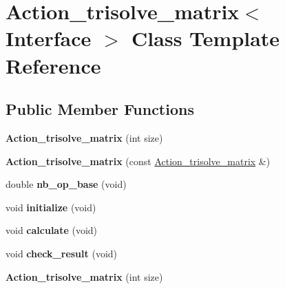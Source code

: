 \hypertarget{class_action__trisolve__matrix}{}\section{Action\+\_\+trisolve\+\_\+matrix$<$ Interface $>$ Class Template Reference}
\label{class_action__trisolve__matrix}
\subsection*{Public Member Functions}
\begin{DoxyCompactItemize}
\item 
\mbox{\label{class_action__trisolve__matrix_a69b680dabcaa6d127739ebf3249b5913}} 
{\bfseries Action\+\_\+trisolve\+\_\+matrix} (int size)
\item 
\mbox{\label{class_action__trisolve__matrix_a4a388b0c2524ea7dc74e7903eb2c8071}} 
{\bfseries Action\+\_\+trisolve\+\_\+matrix} (const \hyperlink{class_action__trisolve__matrix}{Action\+\_\+trisolve\+\_\+matrix} \&)
\item 
\mbox{\label{class_action__trisolve__matrix_aef787d79a7c993c4043afb05f583025d}} 
double {\bfseries nb\+\_\+op\+\_\+base} (void)
\item 
\mbox{\label{class_action__trisolve__matrix_a2770b4c49eeea866ea5a12e6aa2becd1}} 
void {\bfseries initialize} (void)
\item 
\mbox{\label{class_action__trisolve__matrix_a888cafb9f52eaf774e010aee4f88402f}} 
void {\bfseries calculate} (void)
\item 
\mbox{\label{class_action__trisolve__matrix_a010df6dd748507281b2b15922bc51e84}} 
void {\bfseries check\+\_\+result} (void)
\item 
\mbox{\label{class_action__trisolve__matrix_a69b680dabcaa6d127739ebf3249b5913}} 
{\bfseries Action\+\_\+trisolve\+\_\+matrix} (int size)
\item 
\mbox{\label{class_action__trisolve__matrix_a4a388b0c2524ea7dc74e7903eb2c8071}} 

\end{DoxyCompactItemize}
